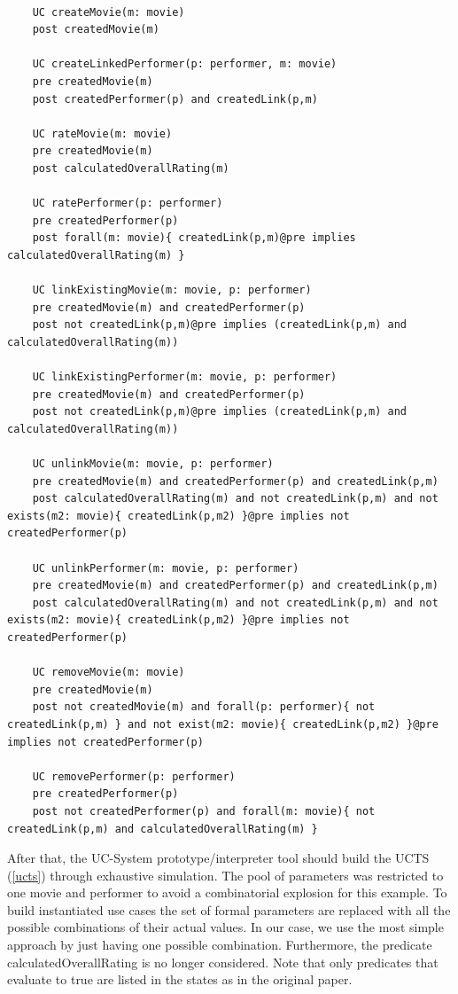 \begin{lstlisting}[caption={Contracts attached to use cases},label={contracts1}]
	
	UC createMovie(m: movie)
	post createdMovie(m)
	
	UC createLinkedPerformer(p: performer, m: movie)
	pre createdMovie(m)
	post createdPerformer(p) and createdLink(p,m)
	
	UC rateMovie(m: movie)
	pre createdMovie(m)
	post calculatedOverallRating(m)
	
	UC ratePerformer(p: performer)
	pre createdPerformer(p)
	post forall(m: movie){ createdLink(p,m)@pre implies calculatedOverallRating(m) }
	
	UC linkExistingMovie(m: movie, p: performer)
	pre createdMovie(m) and createdPerformer(p)
	post not createdLink(p,m)@pre implies (createdLink(p,m) and calculatedOverallRating(m))
	
	UC linkExistingPerformer(m: movie, p: performer)
	pre createdMovie(m) and createdPerformer(p)
	post not createdLink(p,m)@pre implies (createdLink(p,m) and calculatedOverallRating(m))
	
	UC unlinkMovie(m: movie, p: performer)
	pre createdMovie(m) and createdPerformer(p) and createdLink(p,m)
	post calculatedOverallRating(m) and not createdLink(p,m) and not exists(m2: movie){ createdLink(p,m2) }@pre implies not createdPerformer(p)
	
	UC unlinkPerformer(m: movie, p: performer)
	pre createdMovie(m) and createdPerformer(p) and createdLink(p,m)
	post calculatedOverallRating(m) and not createdLink(p,m) and not exists(m2: movie){ createdLink(p,m2) }@pre implies not createdPerformer(p)
	
	UC removeMovie(m: movie)
	pre createdMovie(m)
	post not createdMovie(m) and forall(p: performer){ not createdLink(p,m) } and not exist(m2: movie){ createdLink(p,m2) }@pre implies not createdPerformer(p)
	
	UC removePerformer(p: performer)
	pre createdPerformer(p)
	post not createdPerformer(p) and forall(m: movie){ not createdLink(p,m) and calculatedOverallRating(m) }
\end{lstlisting}

After that, the UC-System prototype/interpreter tool should build the UCTS (\autoref{ucts}) through exhaustive simulation. The pool of parameters was restricted to one movie and performer to avoid a combinatorial explosion for this example. To build instantiated use cases the set of formal parameters are replaced with all the possible combinations of their actual values. In our case, we use the most simple approach by just having one possible combination. Furthermore, the predicate calculatedOverallRating is no longer considered. Note that only predicates that evaluate to true are listed in the states as in the original paper. 

